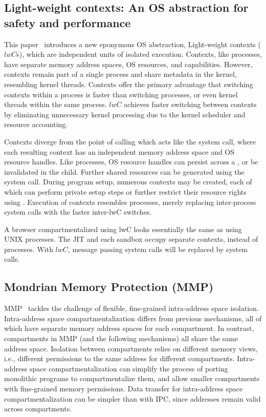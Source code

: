 \subsection{Light-weight contexts: An OS abstraction for safety and performance}
This paper~\cite{LittonVE0BD16} introduces a new eponymous OS abstraction,
Light-weight contexts ($lwC$s),
which are independent units of isolated execution.
Contexts, like processes, have separate memory address spaces, OS resources,
and capabilities.
However, contexts remain part of a single process and share metadata in the 
kernel, resembling kernel threads.
Contexts offer the primary advantage that switching contexts within a process is 
faster than switching processes, or even kernel threads within the same process.
$lwC$ achieves faster switching between contexts by eliminating unnecessary kernel
processing due to the kernel scheduler and resource accounting.

Contexts diverge from the point of calling  which acts like
the  system call, where each resulting context has an 
independent memory address space and OS resource handles.
Like processes, OS resource handles can persist across a , or be
invalidated in the child.
Further shared resources can be generated using the  system 
call.
During program setup, numerous contexts may be created, each of which can
perform private setup steps or further restrict their resource rights using
.
Execution of contexts resembles processes, merely replacing inter-process system
calls with the faster inter-lwC switches.

A browser compartmentalized using lwC looks essentially the same as
using UNIX processes. 
The JIT and each sandbox occupy separate contexts, instead of processes.
With $lwC$, message passing system calls will be replaced by
 system calls.

\subsection{Mondrian Memory Protection (MMP)}
MMP~\cite{WitchelCA02MMP} tackles the challenge of flexible, 
fine-grained intra-address space isolation.
Intra-address space compartmentalization differs from previous mechanisms,
all of which have separate memory address spaces for each compartment.
In contrast, compartments in MMP (and the following mechanisms) all share the
same address space.
Isolation between compartments relies on different 
memory views, i.e., different permissions to the same address for 
different compartments.
Intra-address space compartmentalization can simplify the process of
porting monolithic programs to compartmentalize them, and allow
smaller compartments with fine-grained memory permissions.
Data transfer for intra-address space compartmentalization can be simpler
than with IPC, since addresses remain valid across compartments.


